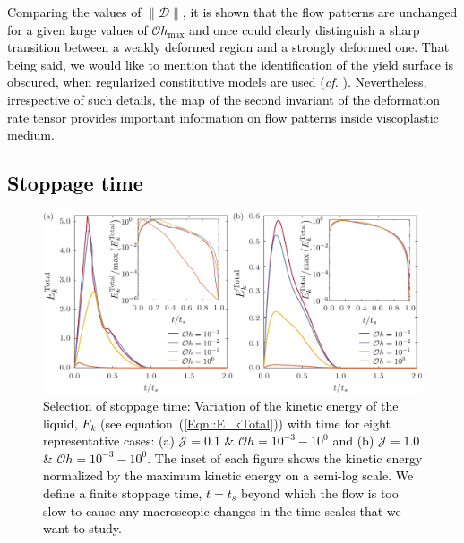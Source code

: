 \documentclass[final]{jfm}
\newcommand*\red{\textcolor{black}}
\begin{document}
\red{Comparing the values of $\|\boldsymbol{\mathcal{D}}\|$, it is shown that the flow patterns are unchanged for a given large values of $\mathcal{O}h_{\text{max}}$ and once could clearly distinguish a sharp transition between a weakly deformed region and a strongly deformed one. That being said, we would like to mention that the identification of the yield surface is obscured, when regularized constitutive models are used (\textit{cf.} \cite{frigaard2005usage}). Nevertheless, irrespective of such details, the map of the second invariant of the deformation rate tensor provides important information on flow patterns inside viscoplastic medium.}

\subsection{\red{Stoppage time}}\label{App::StoppageTime}
\begin{figure}
	\centerline{\includegraphics[width=\linewidth]{Figures/FigureE2_StoppageTime-eps-converted-to.pdf}}%
	\caption{\red{Selection of stoppage time: Variation of the kinetic energy of the liquid, $E_k$ (see equation~(\ref{Eqn::E_kTotal})) with time for eight representative cases: (a) $\mathcal{J} = 0.1$ \& $\mathcal{O}h = 10^{-3} - 10^0$ and (b) $\mathcal{J} = 1.0$  \& $\mathcal{O}h = 10^{-3} - 10^0$. The inset of each figure shows the kinetic energy normalized by the maximum kinetic energy on a semi-log scale. We define a finite stoppage time, $t = t_s$ beyond which the flow is too slow to cause any macroscopic changes in the time-scales that we want to study.}}
	\label{fig:StoppageTime}
\end{figure}
\end{document}
